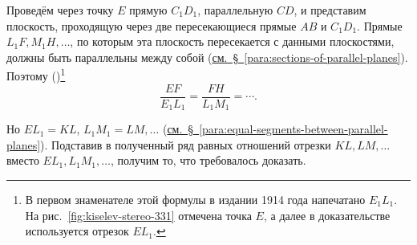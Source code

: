 Проведём через точку \(E\) прямую \(C_1D_1\), параллельную \(CD\), и представим плоскость, проходящую через две пересекающиеся прямые \(AB\) и \(C_1D_1\). Прямые \(L_1F,M_1H,\ldots\), по которым эта плоскость пересекается с данными плоскостями, должны быть параллельны между собой (\hyperref[para:sections-of-parallel-planes]{см.~§~\ref*{para:sections-of-parallel-planes}}). Поэтому ()\footnote{В первом знаменателе этой формулы в издании 1914 года напечатано \(E_1L_1\). На рис.~\ref{fig:kiselev-stereo-331} отмечена точка \(E\), а далее в доказательстве используется отрезок \(EL_1\).}
\[
    \frac{EF}{E_1L_1}=\frac{FH}{L_1M_1}=\cdots.
\]

Но \(EL_1=KL\), \(L_1M_1=LM,\ldots\) (\hyperref[para:equal-segments-between-parallel-planes]{см.~§~\ref*{para:equal-segments-between-parallel-planes}}). Подставив в полученный ряд равных отношений отрезки \(KL,LM,\ldots\) вместо \(EL_1,L_1M_1,\ldots\), получим то, что требовалось доказать.

\clearpage
\endgroup
